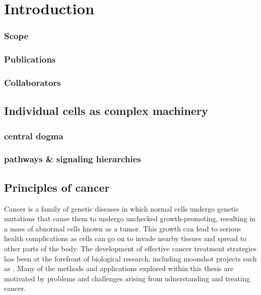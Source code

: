 \chapter{Introduction}
\subsection{Scope}
\subsection{Publications}
\subsection{Collaborators}

\section{Individual cells as complex machinery}
\subsection{central dogma}
\subsection{pathways \& signaling hierarchies}

\section{Principles of cancer}
Cancer is a family of genetic diseases in which normal cells undergo genetic mutations that cause them to undergo unchecked growth-promoting, resulting in a mass of abnormal cells known as a tumor.
This growth can lead to serious health complications as cells
can go on to invade nearby tissues and spread to other parts of the body.
The development of effective cancer treatment strategies has been at the forefront of biological research, including moonshot projects such as \cite{need}. %
Many of the methods and applications explored within this thesis are motivated by problems and challenges arising from udnerstanding and treating cancer.

